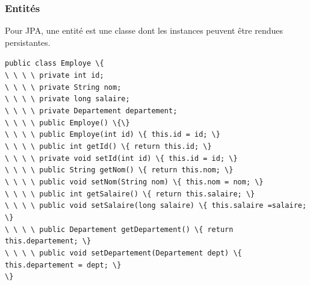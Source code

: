 \documentclass[xcolor=pdftex,x11names,table]{beamer}
\begin{document}
	 \lstset{basicstyle=\scriptsize,language=Java}
   \begin{frame}
     \frametitle{Entités}
     Pour JPA, une entité est une classe dont les instances peuvent être rendues persistantes. \pause
     \begin{block}{}\footnotesize
    	\lstinline$public class Employe \{$\\
    	\lstinline$\ \ \ \ private int id;$\\
    	\lstinline$\ \ \ \ private String nom;$\\
    	\lstinline$\ \ \ \ private long salaire;$\\
    	\lstinline$\ \ \ \ private Departement departement;$\\
    	\lstinline$\ \ \ \ public Employe() \{\}$\\
    	\lstinline$\ \ \ \ public Employe(int id) \{ this.id = id; \}$\\
    	\lstinline$\ \ \ \ public int getId() \{ return this.id; \}$\\
    	\lstinline$\ \ \ \ private void setId(int id) \{ this.id = id; \}$\\
    	\lstinline$\ \ \ \ public String getNom() \{ return this.nom; \}$\\
    	\lstinline$\ \ \ \ public void setNom(String nom) \{ this.nom = nom; \}$\\
    	\lstinline$\ \ \ \ public int getSalaire() \{ return this.salaire; \}$\\
    	\lstinline$\ \ \ \ public void setSalaire(long salaire) \{ this.salaire =salaire; \}$\\
    	\lstinline$\ \ \ \ public Departement getDepartement() \{ return this.departement; \}$\\
    	\lstinline$\ \ \ \ public void setDepartement(Departement dept) \{ this.departement = dept; \}$\\
    	\lstinline$\}$
		 \end{block}
  \end{frame}
  
\end{document}
